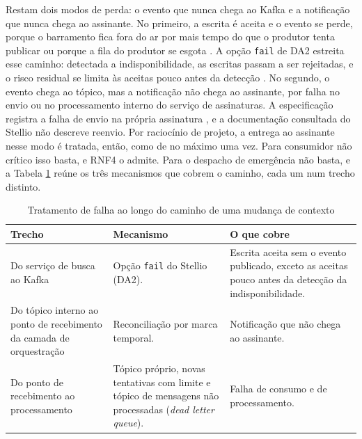 Restam dois modos de perda: o evento que nunca chega ao Kafka e a notificação que nunca chega ao assinante. No primeiro, a escrita é aceita e o evento se perde, porque o barramento fica fora do ar por mais tempo do que o produtor tenta publicar ou porque a fila do produtor se esgota \cite{stellio2025docs}. A opção \texttt{fail} de DA2 estreita esse caminho: detectada a indisponibilidade, as escritas passam a ser rejeitadas, e o risco residual se limita às aceitas pouco antes da detecção \cite{stellio2025docs}. No segundo, o evento chega ao tópico, mas a notificação não chega ao assinante, por falha no envio ou no processamento interno do serviço de assinaturas. A especificação registra a falha de envio na própria assinatura \cite{etsi2024ngsild}, e a documentação consultada do Stellio não descreve reenvio. Por raciocínio de projeto, a entrega ao assinante nesse modo é tratada, então, como de no máximo uma vez. Para consumidor não crítico isso basta, e RNF4 o admite. Para o despacho de emergência não basta, e a Tabela \ref{tab:falhas} reúne os três mecanismos que cobrem o caminho, cada um num trecho distinto.

\begin{table}[!htbp]
\centering
\caption{Tratamento de falha ao longo do caminho de uma mudança de contexto}
\label{tab:falhas}
\scriptsize
\begin{tabularx}{\textwidth}{@{}>{\raggedright\arraybackslash}p{4.2cm}>{\raggedright\arraybackslash}X>{\raggedright\arraybackslash}X@{}}
\toprule
\textbf{Trecho} & \textbf{Mecanismo} & \textbf{O que cobre} \\
\midrule
Do serviço de busca ao Kafka & Opção \texttt{fail} do Stellio (DA2). & Escrita aceita sem o evento publicado, exceto as aceitas pouco antes da detecção da indisponibilidade. \\
\addlinespace
Do tópico interno ao ponto de recebimento da camada de orquestração & Reconciliação por marca temporal. & Notificação que não chega ao assinante. \\
\addlinespace
Do ponto de recebimento ao processamento & Tópico próprio, novas tentativas com limite e tópico de mensagens não processadas (\textit{dead letter queue}). & Falha de consumo e de processamento. \\
\bottomrule
\end{tabularx}
\end{table}

